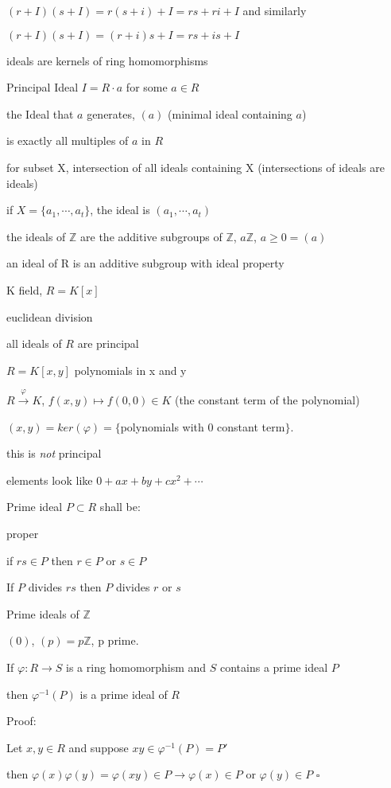 \documentclass[12pt]{article}
\begin{document}
$(r + I)(s + I) = r(s + i) + I = rs + ri + I$ and similarly

$(r + I)(s + I) = (r + i)s + I = rs + is + I$

ideals are kernels of ring homomorphisms

\noindent
Principal Ideal $I = R \cdot a$ for some $a \in R$

the Ideal that $a$ generates, $(a)$ (minimal ideal containing $a$)

is exactly all multiples of $a$ in $R$

for subset X, intersection of all ideals containing X (intersections of ideals are ideals)

if $X = \{a_1, \cdots, a_t\}$, the ideal is $(a_1, \cdots, a_t)$

\noindent
the ideals of $\mathds{Z}$ are the additive subgroups of $\mathds{Z}$, $a\mathds{Z}$, $a \geq 0 = (a)$

an ideal of R is an additive subgroup with ideal property

\noindent
K field, $R = K[x]$

euclidean division

all ideals of $R$ are principal

\noindent
$R = K[x, y]$ polynomials in x and y

$R \xrightarrow{\varphi} K$, $f(x, y) \mapsto f(0, 0) \in K$ (the constant term of the polynomial)

$(x, y) = ker(\varphi) = \{$polynomials with 0 constant term$\}$.

this is \textit{not} principal

elements look like $0 + ax + by + cx^2 + \cdots$

\noindent
Prime ideal $P \subset R$ shall be:

proper

if $rs \in P$ then $r \in P$ or $s \in P$

If $P$ divides $rs$ then $P$ divides $r$ or $s$

\noindent
Prime ideals of $\mathds{Z}$

$(0)$, $(p) = p\mathds{Z}$, p prime.

\noindent
If $\varphi: R \to S$ is a ring homomorphism and $S$ contains a prime ideal $P$

then $\varphi^{-1}(P)$ is a prime ideal of $R$

\noindent
Proof:

Let $x, y \in R$ and suppose $xy \in \varphi^{-1}(P) = P'$

then $\varphi(x)\varphi(y) = \varphi(xy) \in P \to \varphi(x) \in P$ or $\varphi(y) \in P$ $\square$
\end{document}
